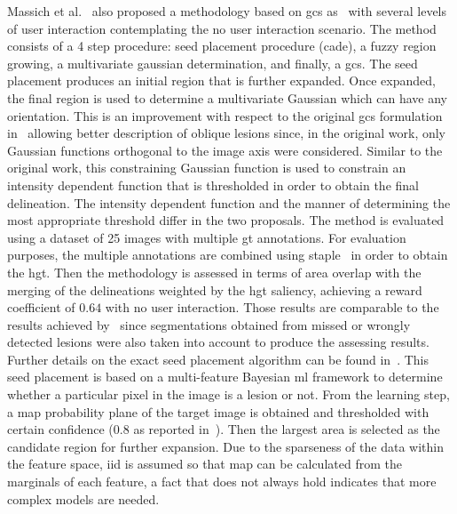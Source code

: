 \documentclass[authoryear,preprint,review,12pt]{elsarticle}
\begin{document}
Massich et al.~\cite{massich2010lesion} also proposed a methodology based on \ac{gcs} as~\cite{Drukker:2002p10442} with several levels of user interaction contemplating the no user interaction scenario. The method consists of a 4 step procedure: seed placement procedure (\ac{cade}), a fuzzy region growing, a multivariate gaussian determination, and finally, a \ac{gcs}. The seed placement produces an initial region that is further expanded. Once expanded, the final region is used to determine a multivariate Gaussian which can have any orientation.
This is an improvement with respect to the original \ac{gcs} formulation in~\cite{Horsch:2001p6028} allowing better description of oblique lesions since, in the original work, only Gaussian functions orthogonal to the image axis were considered. Similar to the original work, this constraining Gaussian function is used to constrain an intensity dependent function that is thresholded in order to obtain the final delineation. The intensity dependent function and the manner of determining the most appropriate threshold differ in the two proposals. The method is evaluated using a dataset of 25 images with multiple \ac{gt} annotations. For evaluation purposes, the multiple annotations are combined using \ac{staple}~\cite{Warfield:2004p9614} in order to obtain the \ac{hgt}. Then the methodology is assessed in terms of area overlap with the merging of the delineations weighted by the \ac{hgt} saliency, achieving a reward coefficient of $0.64$ with no user interaction. Those results are comparable to the results achieved by~\cite{Horsch:2001p6028} since segmentations obtained from missed or wrongly detected lesions were also taken into account to produce the assessing results. Further details on the exact seed placement algorithm can be found in~\cite{massich2011seed,massich2012seed}. This seed placement is based on  a multi-feature Bayesian \ac{ml} framework to determine whether a particular pixel in the image is a lesion or not. From the learning step, a \ac{map} probability plane of the target image is obtained and thresholded with certain confidence ($0.8$ as reported in~\cite{massich2012seed}). Then the largest area is selected as the candidate region for further expansion. Due to the sparseness of the data within the feature space, \ac{iid} is assumed so that \ac{map} can be calculated from the marginals of each feature, a fact that does not always hold indicates that more complex models are needed.
\end{document}
